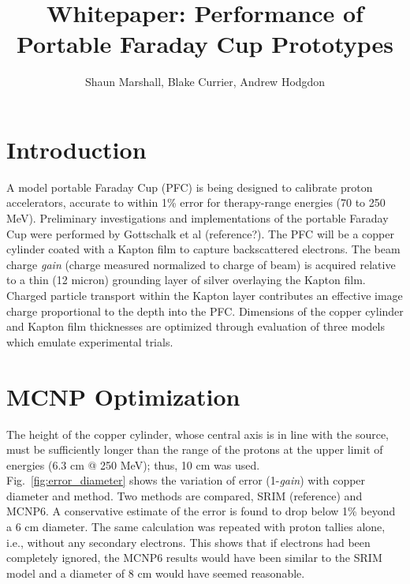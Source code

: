 \documentclass{article}
\title{Whitepaper: Performance of Portable Faraday Cup Prototypes}
\author{Shaun Marshall, Blake Currier, Andrew Hodgdon}
\begin{document}
\maketitle

\section{Introduction}
A model portable Faraday Cup (PFC) is being designed to calibrate proton accelerators, accurate to within 1\% error for therapy-range energies (70 to 250 MeV).  Preliminary investigations and implementations of the portable Faraday Cup were performed by Gottschalk et al (reference?).  The PFC will be a copper cylinder coated with a Kapton film to capture backscattered electrons.  The beam charge \emph{gain} (charge measured normalized to charge of beam) is acquired relative to a thin (12 micron) grounding layer of silver overlaying the Kapton film.  Charged particle transport within the Kapton layer contributes an effective image charge proportional to the depth into the PFC.  Dimensions of the copper cylinder and Kapton film thicknesses are optimized through evaluation of three models which emulate experimental trials.

\section{MCNP Optimization}
The height of the copper cylinder, whose central axis is in line with the source, must be sufficiently longer than the range of the protons at the upper limit of energies (6.3 cm @ 250 MeV); thus, 10 cm was used. \\

Fig.~\ref{fig:error_diameter} shows the variation of error (1-\emph{gain}) with copper diameter and method. Two methods are compared, SRIM (reference) and MCNP6. A conservative estimate of the error is found to drop below 1\% beyond a 6 cm diameter.  The same calculation was repeated with proton tallies alone, i.e., without any secondary electrons. This shows that if electrons had been completely ignored, the MCNP6 results would have been similar to the SRIM model and a diameter of 8 cm would have seemed reasonable.
\end{document}
